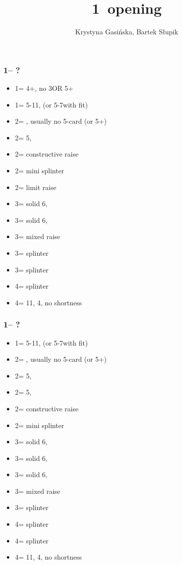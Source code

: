 \documentclass[12pt, a4paper]{article}
\title{1\majs\ opening}
\author{Krystyna Gasińska, Bartek Słupik}
\begin{document}
\maketitle


\subsubsection*{1\hearts -- ?}
\begin{itemize}
    \item 1\spades = 4+\spades, no 3\hearts OR 5\hearts + \gf
    \item 1\nt = 5-11\hcp, (or 5-7\hcp with \hearts fit)
    \item 2\clubs = \gf, usually no 5-card (or 5+\clubs)
    \item 2\diams = 5\diams, \gf
    \item 2\hearts = constructive raise
    \item 2\spades = mini splinter
    \item 2\nt = limit raise
    \item 3\clubs = solid 6\clubs, \inv
    \item 3\diams = solid 6\diams, \inv
    \item 3\hearts = mixed raise
    \item 3\spades = splinter \spades
    \item 3\nt = splinter \diams
    \item 4\clubs = splinter \clubs
    \item 4\diams = 11\hcp, 4\hearts, no shortness
\end{itemize}

\subsubsection*{1\spades -- ?}
\begin{itemize}
    \item 1\nt = 5-11\hcp, (or 5-7\hcp with \spades fit)
    \item 2\clubs = \gf, usually no 5-card (or 5+\clubs)
    \item 2\diams = 5\diams, \gf
    \item 2\hearts = 5\hearts, \gf
    \item 2\spades = constructive raise
    \item 2\nt = mini splinter
    \item 3\clubs = solid 6\clubs, \inv
    \item 3\diams = solid 6\diams, \inv
    \item 3\hearts = solid 6\hearts, \inv
    \item 3\spades = mixed raise
    \item 3\nt = splinter \hearts
    \item 4\clubs = splinter \clubs
    \item 4\diams = splinter \diams
    \item 4\hearts = 11\hcp, 4\spades, no shortness
\end{itemize}

\end{document}
